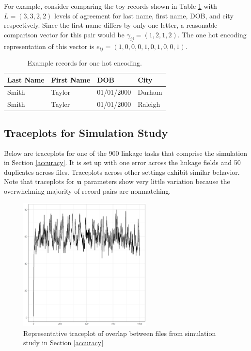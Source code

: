 \documentclass[ba]{imsart}
\begin{document}
	For example, consider comparing the toy records shown in Table \ref{tab:ohe} with $L = (3, 3, 2, 2)$ levels of agreement for last name, first name, DOB, and city respectively. Since the first name differs by only one letter, a reasonable comparison vector for this pair would be $\gamma_{ij} = (1, 2, 1, 2)$. The one hot encoding representation of this vector is $e_{ij} = (1, 0, 0, 0, 1, 0, 1, 0, 0, 1)$. 
	\begin{table}[h!]
		\centering
		\begin{tabular}[h!]{llll}
			\hline
			Last Name & First Name & DOB & City \\
			\hline
			Smith & Taylor & 01/01/2000 & Durham\\
			Smith & Tayler & 01/01/2000 & Raleigh\\
			\hline
		\end{tabular}
		\caption{Example records for one hot encoding.}\label{tab:ohe}
	\end{table}
	
	
	\hypertarget{appendix-sim}{%
		\subsection{Traceplots for Simulation Study}\label{app:appendix-sim}}
	Below are traceplots for one of the 900 linkage tasks that comprise the simulation in Section \ref{accuracy}. It is set up with one error across the linkage fields and 50 duplicates across files. Traceplots across other settings exhibit similar behavior. Note that traceplots for $\bf{u}$ parameters show very little variation because the overwhelming majority of record pairs are nonmatching.  
	
	\begin{figure}[!h]
		\begin{center}
			\includegraphics[width=0.6\textwidth]{../notes/figures/sim_overlap_trace} 
			\caption{Representative traceplot of overlap between files from simulation study in Section \ref{accuracy}}\label{fig:sim_overlap_trace}
		\end{center}
	\end{figure}
	
\end{document}
